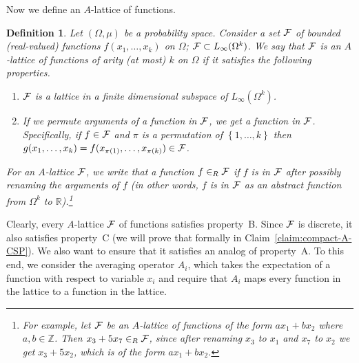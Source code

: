 \documentclass[11pt]{article}
\newcommand {\set}   [1] {\left\{ #1 \right\}}
\newcommand {\bbZ}    {\mathbb{Z}}
\newcommand {\bbR}    {\mathbb{R}}
\newcommand {\calF}   {{\cal{F}}}
\newtheorem{definition}[theorem]{Definition}
\begin{document}
Now we define an $A$-lattice of functions.
\begin{definition}\label{def:A-lattice}
Let $(\Omega,\mu)$ be a probability space.
Consider a set $\calF$ of bounded (real-valued) functions $f(x_1,\dots, x_k)$  on $\Omega$; $\calF \subset L_{\infty}(\Omega^k)$.
We say that $\calF$ is an $A$-lattice of functions of arity (at most) $k$ on $\Omega$ if it satisfies the following properties.
\begin{enumerate}
\item $\calF$ is a lattice in a finite dimensional subspace of $L_{\infty}(\Omega^k)$.
\item If we permute arguments of a function in $\calF$, we get a function in $\calF$. Specifically, if $f\in \calF$ and $\pi$ is a permutation of $\set{1,\dots, k}$ then $g(x_1,\dots, x_k) = f(x_{\pi(1)},\dots, x_{\pi(k)}) \in\calF$.
\end{enumerate}

For an $A$-lattice $\calF$, we write that a function $f\in_R \calF$ if $f$ is in $\calF$ after possibly renaming the arguments of $f$
(in other words, $f$ is in $\calF$ as an abstract function from $\Omega^k$ to $\bbR$).\footnote{For example, let $\calF$ be an $A$-lattice of
functions of the form $ax_1 + bx_2$ where $a,b\in \bbZ$. Then $x_3 + 5 x_7 \in_R \calF$, since after renaming $x_3$ to $x_1$ and $x_7$ to $x_2$ we get
$x_3 + 5x_2$, which is of the form  $ax_1 + bx_2$.}
\end{definition}
Clearly, every $A$-lattice $\calF$ of functions satisfies property~B. Since $\calF$ is discrete, it also satisfies property~C (we will prove that formally in
Claim~\ref{claim:compact-A-CSP}). We also want to ensure that it satisfies an analog of property~A.
To this end, we consider the averaging operator $A_i$, which takes the expectation of a function with respect to variable $x_i$  and require
that $A_i$ maps every function in the lattice to a function in the lattice.
\end{document}
